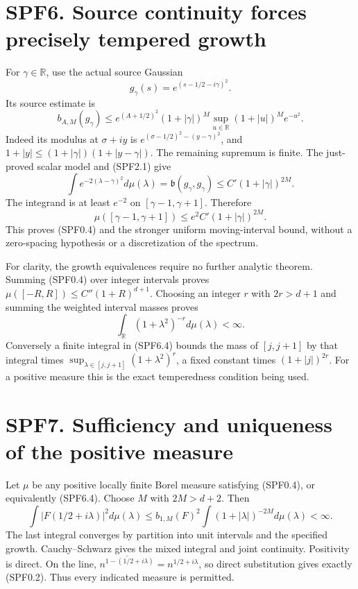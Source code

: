 \section{SPF6. Source continuity forces precisely tempered
growth}\label{spf6.-source-continuity-forces-precisely-tempered-growth}

For \(\gamma\in\mathbb R\), use the actual source Gaussian \[
g_\gamma(s)=e^{(s-1/2-i\gamma)^2}.
\] Its source estimate is \[
b_{A,M}(g_\gamma)\le
e^{(A+1/2)^2}(1+|\gamma|)^M
\sup_{u\in\mathbb R}(1+|u|)^Me^{-u^2}.
\tag{SPF6.1}
\] Indeed its modulus at \(\sigma+iy\) is
\(e^{(\sigma-1/2)^2-(y-\gamma)^2}\), and
\(1+|y|\le(1+|\gamma|)(1+|y-\gamma|)\). The remaining supremum is
finite. The just-proved scalar model and (SPF2.1) give \[
\int e^{-2(\lambda-\gamma)^2}d\mu(\lambda)
=\mathfrak b(g_\gamma,g_\gamma)
\le C'(1+|\gamma|)^{2M}.
\tag{SPF6.2}
\] The integrand is at least \(e^{-2}\) on \([\gamma-1,\gamma+1]\).
Therefore \[
\mu([\gamma-1,\gamma+1])\le e^2C'(1+|\gamma|)^{2M}.
\tag{SPF6.3}
\] This proves (SPF0.4) and the stronger uniform moving-interval bound,
without a zero-spacing hypothesis or a discretization of the spectrum.

For clarity, the growth equivalences require no further analytic
theorem. Summing (SPF0.4) over integer intervals proves
\(\mu([-R,R])\le C''(1+R)^{d+1}\). Choosing an integer \(r\) with
\(2r>d+1\) and summing the weighted interval masses proves \[
\int_{\mathbb R}(1+\lambda^2)^{-r}d\mu(\lambda)<\infty.
\tag{SPF6.4}
\] Conversely a finite integral in (SPF6.4) bounds the mass of
\([j,j+1]\) by that integral times
\(\sup_{\lambda\in[j,j+1]}(1+\lambda^2)^r\), a fixed constant times
\((1+|j|)^{2r}\). For a positive measure this is the exact temperedness
condition being used.

\section{SPF7. Sufficiency and uniqueness of the positive
measure}\label{spf7.-sufficiency-and-uniqueness-of-the-positive-measure}

Let \(\mu\) be any positive locally finite Borel measure satisfying
(SPF0.4), or equivalently (SPF6.4). Choose \(M\) with \(2M>d+2\). Then
\[
\int |F(1/2+i\lambda)|^2d\mu(\lambda)
\le b_{1,M}(F)^2
\int(1+|\lambda|)^{-2M}d\mu(\lambda)<\infty.
\tag{SPF7.1}
\] The last integral converges by partition into unit intervals and the
specified growth. Cauchy--Schwarz gives the mixed integral and joint
continuity. Positivity is direct. On the line,
\(\overline{n^{1-(1/2+i\lambda)}}=n^{1/2+i\lambda}\), so direct
substitution gives exactly (SPF0.2). Thus every indicated measure is
permitted.

